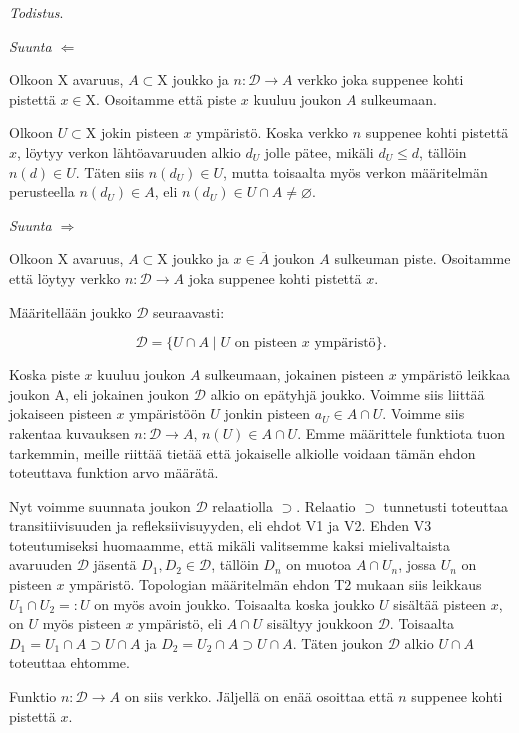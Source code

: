 \documentclass[12pt,a4paper,leqno]{report}
\newcommand{\X}{\mathrm{X}}
\newcommand{\D}{\mathcal{D}}
\newcommand{\verkop}{\leq}
\theoremstyle{plain}
\theoremstyle{definition}
\theoremstyle{remark}
\begin{document}
\noindent\emph{Todistus}.

\emph{Suunta $\Leftarrow$}

Olkoon $\X$ avaruus, $A \subset \X$ joukko ja $n : \D \to A$ verkko joka suppenee kohti pistettä $x \in \X$. Osoitamme että piste $x$ kuuluu joukon $A$ sulkeumaan.

Olkoon $U \subset \X$ jokin pisteen $x$ ympäristö. Koska verkko $n$ suppenee kohti pistettä $x$, löytyy verkon lähtöavaruuden alkio $d_U$ jolle pätee, mikäli $d_U \verkop d$, tällöin $n(d) \in U$. Täten siis $n(d_U) \in U$, mutta toisaalta myös verkon määritelmän perusteella $n(d_U) \in A$, eli $n(d_U) \in U \cap A \not= \varnothing$.

\emph{Suunta $\Rightarrow$}

Olkoon $\X$ avaruus, $A \subset \X$ joukko ja $x \in \overline{A}$ joukon $A$ sulkeuman piste. Osoitamme että löytyy verkko $n : \D \to A$ joka suppenee kohti pistettä $x$.

Määritellään joukko $\D$ seuraavasti:

\begin{equation}
\D = \{U \cap A \mid U \text{ on pisteen }x\text{ ympäristö}\}\text{.}
\end{equation}

Koska piste $x$ kuuluu joukon $A$ sulkeumaan, jokainen pisteen $x$ ympäristö leikkaa joukon A, eli jokainen joukon $\D$ alkio on epätyhjä joukko. Voimme siis liittää jokaiseen pisteen $x$ ympäristöön $U$ jonkin pisteen $a_U \in A \cap U$. Voimme siis rakentaa kuvauksen $n : \D \to A$, $n(U) \in A \cap U$. Emme määrittele funktiota tuon tarkemmin, meille riittää tietää että jokaiselle alkiolle voidaan tämän ehdon toteuttava funktion arvo määrätä.

Nyt voimme suunnata joukon $\D$ relaatiolla $\supset$. Relaatio $\supset$ tunnetusti toteuttaa transitiivisuuden ja refleksiivisuyyden, eli ehdot V1 ja V2. Ehden V3 toteutumiseksi huomaamme, että mikäli valitsemme kaksi mielivaltaista avaruuden $\D$ jäsentä $D_1, D_2 \in \D$, tällöin $D_n$ on muotoa $A \cap U_n$, jossa $U_n$ on pisteen $x$ ympäristö. Topologian määritelmän ehdon T2 mukaan siis leikkaus $U_1 \cap U_2 =: U$ on myös avoin joukko. Toisaalta koska joukko $U$ sisältää pisteen $x$, on $U$ myös pisteen $x$ ympäristö, eli $A \cap U$ sisältyy joukkoon $\D$. Toisaalta $D_1 = U_1 \cap A \supset U \cap A$ ja $D_2 = U_2 \cap A \supset U \cap A$. Täten joukon $\D$ alkio $U \cap A$ toteuttaa ehtomme.

Funktio $n : \D \to A$ on siis verkko. Jäljellä on enää osoittaa että $n$ suppenee kohti pistettä $x$.
\end{document}
